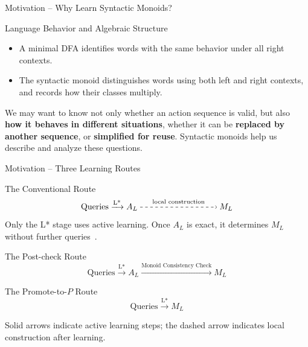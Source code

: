 \documentclass{beamer}
\begin{document}
\begin{frame}{Motivation -- Why Learn Syntactic Monoids?}
    \begin{block}{Language Behavior and Algebraic Structure}
        \begin{itemize}
            \item A minimal DFA identifies words with the same behavior
            under all right contexts.
            \item The syntactic monoid distinguishes words using both
            left and right contexts, and records how their classes multiply.
        \end{itemize}
    \end{block}

    \medskip
    We may want to know not only whether an action sequence is valid,
    but also \textbf{how it behaves in different situations}, whether it
    can be \textbf{replaced by another sequence}, or
    \textbf{simplified for reuse}.
    Syntactic monoids help us describe and analyze these questions.
\end{frame}

\begin{frame}{Motivation -- Three Learning Routes}
    \begin{block}{The Conventional Route}
        \[
        \text{Queries}\xrightarrow{\text{L*}} A_L
        \mathrel{\tikz[baseline=-0.6ex]{
            \draw[dashed,->,line width=0.45pt] (0,0)--(3.2,0);
            \node[above=4pt,inner sep=0pt,font=\scriptsize] at (1.6,0)
                {local construction};
        }} M_L
        \]
        {\small Only the L* stage uses active learning. Once $A_L$ is exact,
        it determines $M_L$ without further queries~\cite{froidure1997algorithms}.}
    \end{block}

    \begin{block}{The Post-check Route}
        \[
        \text{Queries}\xrightarrow{\text{L*}} A_L
        \xrightarrow{\text{Monoid Consistency Check}} M_L
        \]
    \end{block}

    \begin{block}{The Promote-to-$P$ Route}
        \[
        \text{Queries}\xrightarrow{\text{L*}} M_L
        \]
    \end{block}

    {\footnotesize Solid arrows indicate active learning steps; the dashed arrow
    indicates local construction after learning.}
\end{frame}
\end{document}

